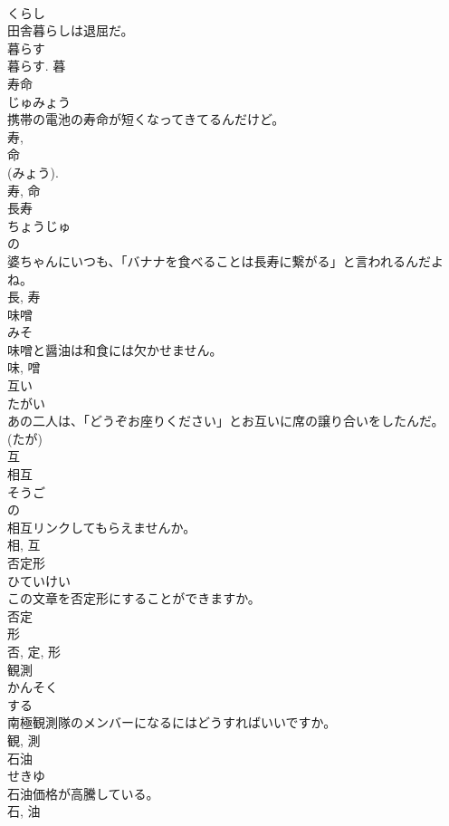 \documentclass[8pt]{extreport}
\begin{document}
\begin{CJK}{UTF8}{min}
\\	くらし	
\\	田舎暮らしは退屈だ。	
\\	暮らす 
\\	暮らす.	暮	
\\	寿命	
\\	じゅみょう	
\\	携帯の電池の寿命が短くなってきてるんだけど。	
\\	寿, 
\\	命 
\\	(みょう). 
\\	寿, 命	
\\	長寿	
\\	ちょうじゅ	
\\	の 
\\	婆ちゃんにいつも、「バナナを食べることは長寿に繋がる」と言われるんだよね。	
\\	長, 寿	
\\	味噌	
\\	みそ	
\\	味噌と醤油は和食には欠かせません。	
\\	味, 噌	
\\	互い	
\\	たがい	
\\	あの二人は、「どうぞお座りください」とお互いに席の譲り合いをしたんだ。	
\\	(たが) 
\\	互	
\\	相互	
\\	そうご	
\\	の 
\\	相互リンクしてもらえませんか。	
\\	相, 互	
\\	否定形	
\\	ひていけい	
\\	この文章を否定形にすることができますか。	
\\	否定 
\\	形 
\\	否, 定, 形	
\\	観測	
\\	かんそく	
\\	する 
\\	南極観測隊のメンバーになるにはどうすればいいですか。	
\\	観, 測	
\\	石油	
\\	せきゆ	
\\	石油価格が高騰している。	
\\	石, 油	

\end{CJK}
\end{document}

